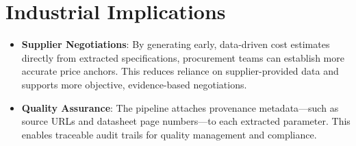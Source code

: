 \section{Industrial Implications}
\begin{itemize}
  \item \textbf{Supplier Negotiations}: By generating early, data-driven cost estimates directly from extracted specifications, procurement teams can establish more accurate price anchors. This reduces reliance on supplier-provided data and supports more objective, evidence-based negotiations.
  \item \textbf{Quality Assurance}: The pipeline attaches provenance metadata—such as source URLs and datasheet page numbers—to each extracted parameter. This enables traceable audit trails for quality management and compliance.
\end{itemize}

